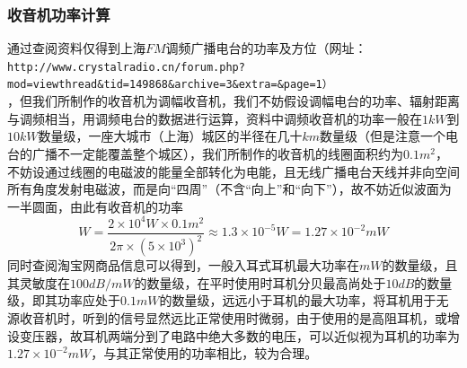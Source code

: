 \documentclass[10pt,a4paper]{article}
\theoremstyle{remark}
\begin{document}
\subsubsection{收音机功率计算}
通过查阅资料仅得到上海$FM$调频广播电台的功率及方位（网址：\\\verb|http://www.crystalradio.cn/forum.php?mod=viewthread&tid=149868&archive=3&extra=&page=1）|\\
，但我们所制作的收音机为调幅收音机，我们不妨假设调幅电台的功率、辐射距离与调频相当，用调频电台的数据进行运算，资料中调频收音机的功率一般在$1kW$到$10kW$数量级，一座大城市（上海）城区的半径在几十$km$数量级（但是注意一个电台的广播不一定能覆盖整个城区），我们所制作的收音机的线圈面积约为$0.1m^2$，不妨设通过线圈的电磁波的能量全部转化为电能，且无线广播电台天线并非向空间所有角度发射电磁波，而是向“四周”（不含“向上”和“向下”），故不妨近似波面为一半圆面，由此有收音机的功率
\[
W = \frac{2\times10^4W\times0.1m^2}{2\pi\times(5\times{10}^{3})^2} \approx 1.3\times{10}^{-5}W = 1.27\times{10}^{-2}mW
\]
同时查阅淘宝网商品信息可以得到，一般入耳式耳机最大功率在$mW$的数量级，且其灵敏度在$100dB/mW$的数量级，在平时使用时耳机分贝最高尚处于$10dB$的数量级，即其功率应处于$0.1mW$的数量级，远远小于耳机的最大功率，将耳机用于无源收音机时，听到的信号显然远比正常使用时微弱，由于使用的是高阻耳机，或增设变压器，故耳机两端分到了电路中绝大多数的电压，可以近似视为耳机的功率为$1.27\times{10}^{-2}mW$，与其正常使用的功率相比，较为合理。
\end{document}
